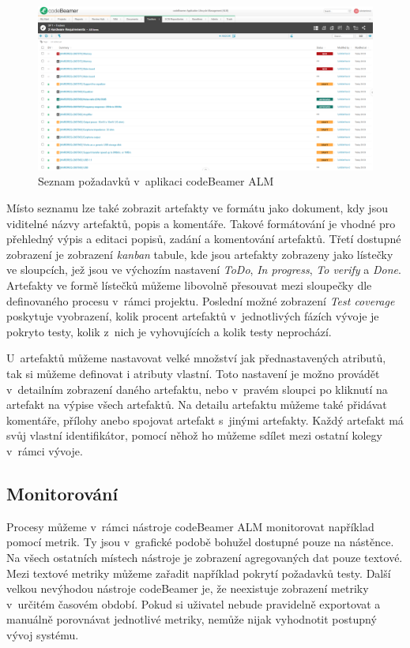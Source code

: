 \documentclass[czech,master]{diploma}
\begin{document}
\begin{figure}[!ht]
    \centering
    \includegraphics[width=1\textwidth]{Diplomka/Figures/codebeamer_requirments.png}
    \caption{Seznam požadavků v~aplikaci codeBeamer ALM}
    \label{fig:codebeamer_requirments}
\end{figure}

Místo seznamu lze také zobrazit artefakty ve formátu jako dokument, kdy jsou viditelné názvy artefaktů, popis a komentáře. Takové formátování je vhodné pro přehledný výpis a editaci popisů, zadání a komentování artefaktů. Třetí dostupné zobrazení je zobrazení \textit{kanban} tabule, kde jsou artefakty zobrazeny jako lístečky ve sloupcích, jež jsou ve výchozím nastavení \textit{ToDo}, \textit{In progress}, \textit{To verify} a \textit{Done}. Artefakty ve formě lístečků můžeme libovolně přesouvat mezi sloupečky dle definovaného procesu v~rámci projektu. Poslední možné zobrazení \textit{Test coverage} poskytuje vyobrazení, kolik procent artefaktů v~jednotlivých fázích vývoje je pokryto testy, kolik z~nich je vyhovujících a kolik testy neprochází.

U~artefaktů můžeme nastavovat velké množství jak přednastavených atributů, tak si můžeme definovat i atributy vlastní. Toto nastavení je možno provádět v~detailním zobrazení daného artefaktu, nebo v~pravém sloupci po kliknutí na artefakt na výpise všech artefaktů. Na detailu artefaktu můžeme také přidávat komentáře, přílohy anebo spojovat artefakt s~jinými artefakty. Každý artefakt má svůj vlastní identifikátor, pomocí něhož ho můžeme sdílet mezi ostatní kolegy v~rámci vývoje.

\subsection{Monitorování}
Procesy můžeme v~rámci nástroje codeBeamer ALM monitorovat například pomocí metrik. Ty jsou v~grafické podobě bohužel dostupné pouze na nástěnce. Na všech ostatních místech nástroje je zobrazení agregovaných dat pouze textové. Mezi textové metriky můžeme zařadit například pokrytí požadavků testy. Další velkou nevýhodou nástroje codeBeamer je, že neexistuje zobrazení metriky v~určitém časovém období. Pokud si uživatel nebude pravidelně exportovat a manuálně porovnávat jednotlivé metriky, nemůže nijak vyhodnotit postupný vývoj systému.
\end{document}
